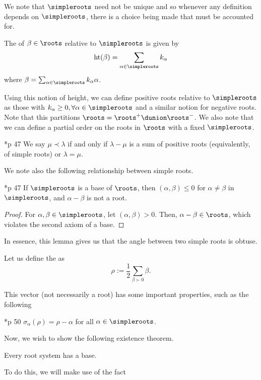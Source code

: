 \documentclass[11pt,leqno,oneside]{amsart}
\numberwithin{thm}{section}
\newcommand{\halfsum}{\rho}
\begin{document}
We note that $\simpleroots$ need not be unique and so whenever any
definition depends on $\simpleroots$, there is a choice being made that must
be accounted for.
\begin{defn}
  The  of $\beta \in \roots$ relative to $\simpleroots$ is given
  by \[
    \operatorname{ht}(\beta) = \sum_{\alpha \in \simpleroots} k_\alpha
  \]
  where $\beta = \sum_{\alpha \in \simpleroots} k_\alpha \alpha$. 
\end{defn}
Using this notion of height, we can define positive roots
relative to $\simpleroots$ as those with $k_\alpha \geq 0, \forall \alpha
\in \simpleroots$ and a similar notion for negative roots. Note that this
partitions $\roots = \roots^+ \dunion \roots^-$. We also note that we can
define a partial order on the roots in $\roots$ with a fixed $\simpleroots$.
\begin{defn}\label{partial-order-on-roots}
  \cite{humph}*{p 47} We say $\mu \prec \lambda$ if and only if $\lambda - \mu$ is a sum
  of positive roots (equivalently, of simple roots) or $\lambda =
  \mu$. 
\end{defn}
We note also the following relationship between simple roots.
\begin{lem}\label{a-b-not-a-root}
  \cite{humph}*{p 47} If $\simpleroots$ is a base of $\roots$, then $(\alpha,
  \beta) \leq 0$ for $\alpha \neq \beta$ in $\simpleroots$, and $\alpha -
  \beta$ is not a root.
\end{lem}
\begin{proof}
  For \(\alpha,\beta \in \simpleroots\), let \((\alpha,\beta) >
  0\). Then, \(\alpha-\beta \in \roots\), which violates the second
  axiom of a base. 
\end{proof}
In essence,
this lemma gives us that the angle between two simple roots is obtuse.
\begin{defn}\label{half-sum-defn}
  Let us define the  as \[
    \halfsum := \frac{1}{2}
  \sum_{\beta \succ 0} \beta.
\]
\end{defn}
This vector (not necessarily a root) has some important properties,
such as the following
\begin{prop}
  \cite{humph}*{p 50} $\sigma_\alpha(\halfsum) = \halfsum-\alpha$ for all
  $\alpha \in \simpleroots$.
\end{prop}
Now, we wish to show the following existence theorem.
\begin{thm}
  Every root system has a base.
\end{thm}
To do this, we will make use of the fact
\end{document}
